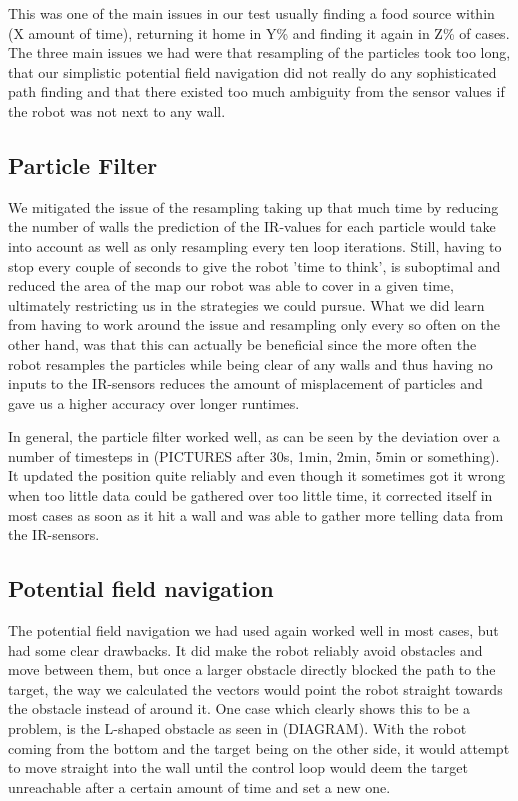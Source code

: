 \documentclass[paper=a4, fontsize=12pt]{scrartcl}	%
\numberwithin{equation}{section}		%
\numberwithin{figure}{section}			%
\numberwithin{table}{section}				%
\begin{document}
This was one of the main issues in our test usually finding a food source within (X amount of time), returning it home in Y\% and finding it again in Z\% of cases. The three main issues we had were that resampling of the particles took too long, that our simplistic potential field navigation did not really do any sophisticated path finding and that there existed too much ambiguity from the sensor values if the robot was not next to any wall.

\subsection{Particle Filter}
We mitigated the issue of the resampling taking up that much time by reducing the number of walls the prediction of the IR-values for each particle would take into account as well as only resampling every ten loop iterations. Still, having to stop every couple of seconds to give the robot 'time to think', is suboptimal and reduced the area of the map our robot was able to cover in a given time, ultimately restricting us in the strategies we could pursue. What we did learn from having to work around the issue and resampling only every so often on the other hand, was that this can actually be beneficial since the more often the robot resamples the particles while being clear of any walls and thus having no inputs to the IR-sensors reduces the amount of misplacement of particles and gave us a higher accuracy over longer runtimes.

In general, the particle filter worked well, as can be seen by the deviation over a number of timesteps in (PICTURES after 30s, 1min, 2min, 5min or something). It updated the position quite reliably and even though it sometimes got it wrong when too little data could be gathered over too little time, it corrected itself in most cases as soon as it hit a wall and was able to gather more telling data from the IR-sensors.

\subsection{Potential field navigation}
The potential field navigation we had used again worked well in most cases, but had some clear drawbacks. It did make the robot reliably avoid obstacles and move between them, but once a larger obstacle directly blocked the path to the target, the way we calculated the vectors would point the robot straight towards the obstacle instead of around it. One case which clearly shows this to be a problem, is the L-shaped obstacle as seen in (DIAGRAM). With the robot coming from the bottom and the target being on the other side, it would attempt to move straight into the wall until the control loop would deem the target unreachable after a certain amount of time and set a new one.
\end{document}
